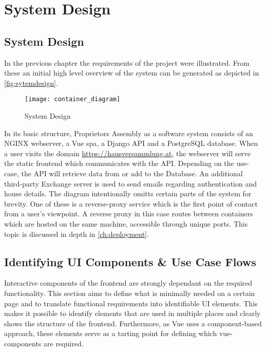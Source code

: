 \chapter{System Design} \label{ch:systemdesign}

\section{System Design} 
In the previous chapter the requirements of the project were illustrated. From these an initial high level overview of the system can be generated as depicted in \autoref{fig:sytemdesign}.

\begin{figure}[H]
    \begin{center}
    \texttt{[image: container\_diagram]}
    \end{center}
    \caption{System Design}
    \label{fig:sytemdesign}
\end{figure}

In its basic structure, Proprietors Assembly as a software system consists of an NGINX webserver, a Vue \acrlong{spa}, a Django API and a PostgreSQL database. When a user visits the domain \url{https://hausversammlung.at}, the webserver will serve the static frontend which communicates with the API. Depending on the use-case, the API will retrieve data from or add to the Database. An additional third-party Exchange server is used to send emails regarding authentication and house details. The diagram intentionally omitts certain parts of the system for brevity. One of these is a reverse-proxy service which is the first point of contact from a user's viewpoint. A reverse proxy in this case routes between containers which are hosted on the same machine, accessible through unique ports. This topic is discussed in depth in \autoref{ch:deployment}.

\section{Identifying UI Components \& Use Case Flows} \label{sec:uicomponents_flows}
Interactive components of the frontend are strongly dependant on the required functionality. This section aims to define what is minimally needed on a certain page and to translate functional requirements into identifiable UI elements. This makes it possible to identify elements that are used in multiple places and clearly shows the structure of the frontend. Furthermore, as Vue uses a component-based approach, these elements serve as a tarting point for defining which vue-components are required.

